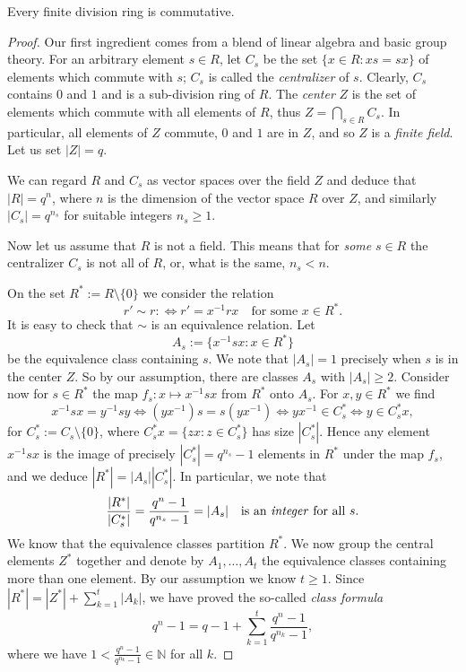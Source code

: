 \begin{theorem}
  \label{wedderburn}
  Every finite division ring is commutative.
\end{theorem}
\begin{proof}
  Our first ingredient comes from a blend of linear algebra and basic group theory.
  For an arbitrary element $s \in R$, let $C_s$ be the set $\{x \in R : xs = sx\}$ of elements which commute with $s$;
  $C_s$ is called the \emph{centralizer} of $s$.
  Clearly, $C_s$ contains $0$ and $1$ and is a sub-division ring of $R$.
  The \emph{center} $Z$ is the set of elements which commute with all elements of $R$, thus $Z = \bigcap_{s \in R} C_s$.
  In particular, all elements of $Z$ commute, $0$ and $1$ are in $Z$, and so $Z$ is a \emph{finite field}.
  Let us set $|Z| = q$.
  
  We can regard $R$ and $C_s$ as vector spaces over the field $Z$ and deduce that $|R| = q^n$, where $n$ is the dimension of the vector space $R$ over $Z$,
  and similarly $|C_s| = q^{n_s}$ for suitable integers $n_s \ge 1$.
  
  Now let us assume that $R$ is not a field.
  This means that for \emph{some} $s \in R$ the centralizer $C_s$ is not all of $R$, or, what is the same, $n_s < n$.
  
  On the set $R^* := R \setminus \{0\}$ we consider the relation
  \[
  r' \sim r :\iff r' = x^{-1}rx \quad \text{for some } x \in R^*.
  \]
  It is easy to check that $\sim$ is an equivalence relation. Let
  \[
  A_s := \{x^{-1}sx : x \in R^*\}
  \]
  be the equivalence class containing $s$.
  We note that $|A_s| = 1$ precisely when $s$ is in the center $Z$.
  So by our assumption, there are classes $A_s$ with $|A_s| \ge 2$.
  Consider now for $s \in R^*$ the map $f_s : x \mapsto x^{-1}sx$ from $R^*$ onto $A_s$.
  For $x, y \in R^*$ we find
  \[
  x^{-1}sx = y^{-1}sy \iff (yx^{-1})s = s(yx^{-1}) \iff yx^{-1} \in C_s^* \iff y \in C_s^* x,
  \]
  for $C_s^* := C_s \setminus \{0\}$, where $C_s^* x = \{zx : z \in C_s^*\}$ has size $|C_s^*|$.
  Hence any element $x^{-1}sx$ is the image of precisely $|C_s^*| = q^{n_s} - 1$ elements in $R^*$ under the map $f_s$,
  and we deduce $|R^*| = |A_s| |C_s^*|$. In particular, we note that
  \[
  \frac{|R^*|}{|C_s^*|} = \frac{q^n - 1}{q^{n_s} - 1} = |A_s| \quad \text{is an \emph{integer} for all } s.
  \]
  We know that the equivalence classes partition $R^*$.
  We now group the central elements $Z^*$ together and denote by $A_1, \dots, A_t$ the equivalence classes containing more than one element.
  By our assumption we know $t \ge 1$.
  Since $|R^*| = |Z^*| + \sum_{k=1}^t |A_k|$, we have proved the so-called \emph{class formula}
  \begin{equation} \label{eq:class_formula}
  q^n - 1 = q - 1 + \sum_{k=1}^t \frac{q^n - 1}{q^{n_k} - 1},
  \end{equation}
  where we have $1 < \frac{q^n - 1}{q^{n_k} - 1} \in \mathbb{N}$ for all $k$.
  

\end{proof}
